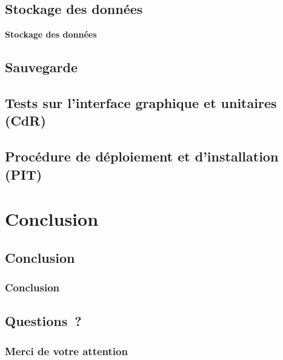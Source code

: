 \documentclass[10pt,fleqn]{beamer}
\begin{document}


\subsection[Stockage des données]{Stockage des données}
\begin{frame}
\tableofcontents[subsectionstyle=show/shaded/hide, subsubsectionstyle=hide, sectionstyle=show/hide]
\end{frame}

\begin{frame}
\begin{block}{\vspace{1cm}\begin{center}\textbf{Stockage des données}\end{center}\vspace{1cm}}
\end{block}
\end{frame}

\subsection[Sauvegarde]{Sauvegarde}
\begin{frame}
\tableofcontents[subsectionstyle=show/shaded/hide, subsubsectionstyle=hide, sectionstyle=show/hide]
\end{frame}


\subsection[Tests sur l'interface graphique et unitaires (CdR)]{Tests sur l'interface graphique et unitaires (CdR)}
\begin{frame}
\tableofcontents[subsectionstyle=show/shaded/hide, subsubsectionstyle=hide, sectionstyle=show/hide]
\end{frame}


\subsection[Procédure de déploiement et d'installation (PIT)]{Procédure de déploiement et d'installation (PIT)}
\begin{frame}
\tableofcontents[subsectionstyle=show/shaded/hide, subsubsectionstyle=hide, sectionstyle=show/hide]
\end{frame}
\begin{frame}
\end{frame}

\section*[Conclusion]{Conclusion}

\subsection[Conclusion]{Conclusion}
\begin{frame}
	\frametitle{Conclusion}
\end{frame}

\subsection[Questions~?]{Questions~?}
\begin{frame}
	\frametitle{Merci de votre attention}
\end{frame}
\end{document}
